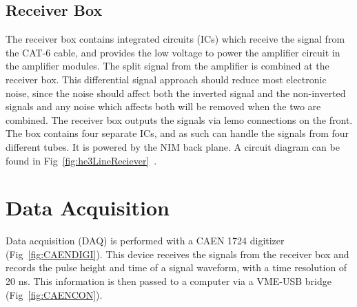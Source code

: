 \subsection{Receiver Box}

	The receiver box contains integrated circuits (ICs) which receive the signal from the CAT-6 cable, and provides the low voltage to power the amplifier circuit in the amplifier modules. The split signal from the amplifier is combined at the receiver box. This differential signal approach should reduce most electronic noise, since the noise should affect both the inverted signal and the non-inverted signals and any noise which affects both will be removed when the two are combined. The receiver box outputs the signals via lemo connections on the front. The box contains four separate ICs, and as such can handle the signals from four different tubes. It is powered by the NIM back plane. A circuit diagram can be found in Fig~\ref{fig:he3LineReciever}~\cite{Honkanen}.



\section{Data Acquisition}

	Data acquisition (DAQ) is performed with a CAEN 1724 digitizer (Fig~\ref{fig:CAENDIGI}). This device receives the signals from the receiver box and records the pulse height and time of a signal waveform, with a time resolution of 20 ns. This information is then passed to a computer via a VME-USB bridge (Fig~\ref{fig:CAENCON}).


